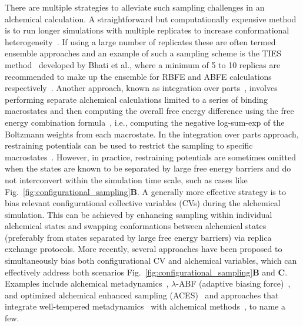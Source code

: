 \documentclass[9pt,bestpractices]{livecoms}
\begin{document}
There are multiple strategies to alleviate such sampling challenges in an alchemical calculation. A straightforward but computationally expensive method is to run longer simulations with multiple replicates to increase conformational heterogeneity~\cite{suruzhon2021sensitivity}.
If using a large number of replicates these are often termed ensemble approaches and an example of such a sampling scheme is the TIES method~\cite{bhati2017} developed by Bhati et al., where a minimum of 5 to 10 replicas are recommended to make up the ensemble for RBFE and ABFE calculations respectively~\cite{bhati2022, bhati2025}.
Another approach, known as integration over parts~\cite{jayachandran2006parallelized}, involves performing separate alchemical calculations limited to a series of binding macrostates and  then computing the overall free energy difference using the free energy combination formula~\cite{gallicchio2011recent,hsu2023alchemical}, i.e., computing the negative log-sum-exp of the Boltzmann weights from each macrostate. In the integration over parts approach, restraining potentials can be used to restrict the sampling to specific macrostates~\cite{khuttan2023taming}. However, in practice, restraining potentials are sometimes omitted when the states are known to be separated by large free energy barriers and do not interconvert within the simulation time scale, such as cases like Fig.~\ref{fig:configurational_sampling}\textbf{B}.
A generally more effective strategy is to bias relevant configurational collective variables (CVs) during the alchemical simulation. This can be achieved by enhancing sampling within individual alchemical states and swapping conformations between alchemical states (preferably from states separated by large free energy barriers) via replica exchange protocols. More recently, several approaches have been proposed to simultaneously bias both configurational CV and alchemical variables, which can effectively address both scenarios Fig.~\ref{fig:configurational_sampling}\textbf{B} and \textbf{C}. Examples include alchemical metadynamics~\cite{hsu2023alchemical}, $\lambda$-ABF (adaptive biasing force)~\cite{lagardere2024lambda}, and optimized alchemical enhanced sampling (ACES)~\cite{lee2023aces}  and approaches that integrate well-tempered metadynamics~\cite{barducci2008well} with alchemical methods~\cite{zhou2025zooming, khuttan2024make}, to name a few.
\end{document}
